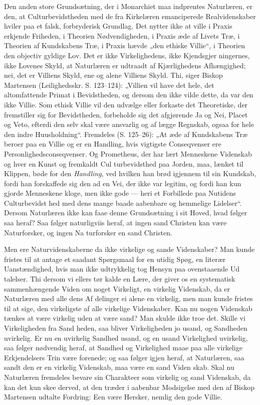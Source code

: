 \documentclass[12pt]{book}
\newcommand{\opage}[1]{\marginnote{\footnotesize\textit{[#1]}}}
\begin{document}
Den anden store Grundsætning, der i Monarchiet maa
indprentes Naturlæren, er den, at Culturbevidstheden med
de fra Kirkelæren emanciperede Realvidenskaber hviler paa et
falsk, forbryderisk Grundlag. Det nytter ikke at ville i
Praxis erkjende Friheden, i Theorien Nødvendigheden, i
Praxis æde af Livets Træ, i Theorien af Kundskabens Træ,
i Praxis hævde „den ethiske Villie“, i Theorien den objectiv
gyldige Lov. Det er ikke Virkelighedens, ikke Kjendsgjer\-%
ningernes, ikke Lovenes Skyld, at Naturlæren er udtraadt af
Kjærlighedens Afhængighed; nei, det er Villiens Skyld, ene
og alene Villiens Skyld. Thi, siger Biskop Martensen
(Leilighedsskr. S. 123--124): „Villien vil have det hele, det
altomfattende Primat i Bevidstheden, og dersom den ikke
vilde dette, da var den ikke Villie. Som ethisk Villie vil
den udvælge eller forkaste det Theoretiske, der fremstiller sig
for Bevidstheden, forbeholde sig det afgjørende Ja og Nei,
Placet og Veto, efterdi den selv skal være ansvarlig og af\-%
lægge Regnskab, ogsaa for hele den indre Huusholdning“.
Fremdeles (S. 125--26): „At æde af Kundskabens Træ beroer
paa en Villie og er en Handling, hvis vigtigste Conseqvenser
ere Personlighedsconseqvenser. Og Prometheus, der har lært
Menneskene Videnskab og hver en Kunst og fremkaldt Cul\-%
turbevidsthed paa Jorden, maa, lænket til Klippen, bøde for
den \emph{Handling}, ved hvilken han brød igjennem til sin
Kundskab, fordi han forskaffede sig den ad en Vei, der ikke
var legitim, og fordi han kun gjorde Menneskene kloge, men
ikke gode --- heri et Forbillede paa Nutidens Culturbevidst\-%
hed med dens mange baade aabenbare og hemmelige Lidelser“.
\opage{11}\setcounter{footnote}{0}%
Dersom Naturlæren ikke kan faae denne Grundsætning i sit
Hoved, hvad følger saa heraf? Saa følger naturligviis heraf,
at ingen sand Christen kan være Naturforsker, og ingen Na\-%
turforsker en sand Christen.

Men ere Naturvidenskaberne da ikke virkelige og sande
Videnskaber? Man kunde fristes til at antage et saadant
Spørgsmaal for en utidig Spøg, en literær Uanstændighed,
hvis man ikke udtrykkelig tog Hensyn paa ovenstaaende Ud\-%
talelser. Thi dersom vi ellers tør kalde en Lære, der giver
os en systematisk sammenhængende Viden om noget Virkeligt,
en virkelig Videnskab, da er Naturlæren med alle dens Af\-%
delinger ei alene en virkelig, men man kunde fristes til at
sige, den virkeligste af alle virkelige Videnskaber. Kan nu
nogen Videnskab tænkes at være virkelig uden at være sand?
Man skulde ikke troe det. Skille vi Virkeligheden fra Sand\-%
heden, saa bliver Virkeligheden jo usand, og Sandheden
uvirkelig. Er nu en uvirkelig Sandhed usand, og en usand
Virkelighed uvirkelig, saa følger nødvendig heraf, at Sandhed
og Virkelighed maae paa alle virkelige Erkjendelsers Trin
være forenede; og saa følger igjen heraf, at Naturlæren, saa\-%
sandt den er en virkelig Videnskab, maa være en sand Viden\-%
skab. Skal nu Naturlæren fremdeles bevare sin Charakteer
som virkelig og sand Videnskab, da kan det kun skee derved,
at den træder i aabenbar Modsigelse med den af Biskop
Martensen udtalte Fordring: Een være Hersker, nemlig den
gode Villie.
\end{document}

